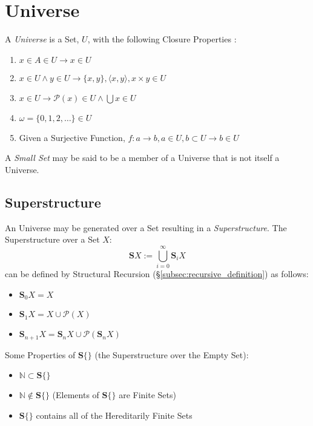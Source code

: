 \documentclass{article}
\begin{document}
\section{Universe}\label{sec:set_universe}

A \emph{Universe} is a Set, $U$, with the following Closure Properties
\cite{maclane69}:
\begin{enumerate}
\item $x \in A \in U \rightarrow x \in U$
\item $x \in U \wedge y \in U \rightarrow \{x,y\}, \langle x,y
  \rangle, x \times y \in U$
\item $x \in U \rightarrow \mathcal{P}(x) \in U \wedge \bigcup x \in U$
\item $\omega = \{0,1,2,\ldots\} \in U$
\item Given a Surjective Function, $f : a \rightarrow b, a \in
  U, b \subset U \rightarrow b \in U$
\end{enumerate}
A \emph{Small Set} may be said to be a member of a Universe that is
not itself a Universe.



\subsection{Superstructure}\label{subsec:superstructure}

An Universe may be generated over a Set resulting in a
\emph{Superstructure}. The Superstructure over a Set $X$:
\[
    \mathbf{S}X := \bigcup^{\infty}_{i=0}\mathbf{S}_i X
\]
can be defined by Structural Recursion
(\S\ref{subsec:recursive_definition}) as follows:
\begin{itemize}

\item $\mathbf{S}_0 X = X$
\item $\mathbf{S}_1 X = X \cup \mathcal{P}(X)$
\item $\mathbf{S}_{n+1} X =
    \mathbf{S}_n X \cup \mathcal{P}(\mathbf{S}_n X)$

\end{itemize}
Some Properties of $\mathbf{S}\{\}$ (the Superstructure over the Empty
Set):
\begin{itemize}

\item $\mathbb{N} \subset \mathbf{S}\{\}$
\item $\mathbb{N} \notin \mathbf{S}\{\}$ (Elements of $\mathbf{S}\{\}$
  are Finite Sets)
\item $\mathbf{S}\{\}$ contains all of the Hereditarily Finite Sets

\end{itemize}
\end{document}
